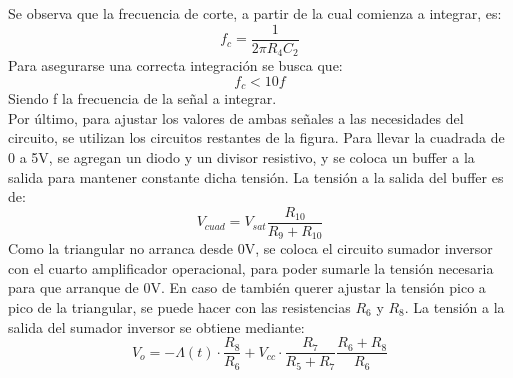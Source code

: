 \documentclass[11pt, a4paper]{article}
\begin{document}
Se observa que la frecuencia de corte, a partir de la cual comienza a integrar, es:
\begin{equation}
    f_c = \frac{1}{2 \pi R_4 C_2}
    \label{eq:integrador}
\end{equation}
Para asegurarse una correcta integraci\'on se busca que: 
\begin{equation*}
    f_c < 10 f
\end{equation*}
Siendo f la frecuencia de la señal a integrar.\\
Por \'ultimo, para ajustar los valores de ambas señales a las necesidades del circuito, se utilizan los circuitos restantes de la figura. Para llevar la cuadrada de 0 a 5V, se agregan un diodo y un divisor resistivo, y se coloca un buffer a la salida para mantener constante dicha tensi\'on. La tensi\'on a la salida del buffer es de:
\begin{equation}
    V_{cuad} = V_{sat} \frac{R_{10}}{R_9 + R_{10}}
    \label{eq:divisor_resist}
\end{equation}
Como la triangular no arranca desde 0V, se coloca el circuito sumador inversor con el cuarto amplificador operacional, para poder sumarle la tensi\'on necesaria para que arranque de 0V. En caso de tambi\'en querer ajustar la tensi\'on pico a pico de la triangular, se puede hacer con las resistencias $R_6$ y $R_8$. La tensi\'on a la salida del sumador inversor se obtiene mediante:
\begin{equation}
    V_o = - \Lambda(t) \cdot \frac{R_{8}}{R_{6}} + V_{cc}\cdot \frac{R_7}{R_5 + R_7} \frac{R_6 + R_8}{R_6}
    \label{eq:sumador}
\end{equation}
%
\end{document}
